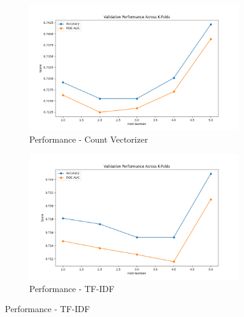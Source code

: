 \begin{figure}[H]
    \centering
    \begin{subfigure}[b]{0.47\textwidth}
        \includegraphics[width=\textwidth]{img/report_info/img/1.3.XGB/best_xgboost_count.png}
        \caption{Performance - Count Vectorizer}
        \label{fig:lr-count}
    \end{subfigure}
    \begin{subfigure}[b]{0.47\textwidth}
        \includegraphics[width=\textwidth]{img/report_info/img/1.3.XGB/best_xgboost_tfidf.png}
        \caption{Performance - TF-IDF}
        \label{fig:lr-tfidf}
    \end{subfigure}
    

\end{figure}
